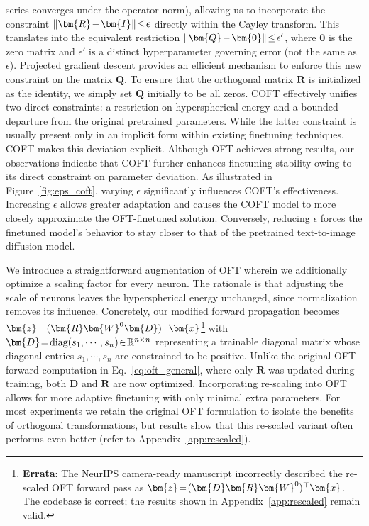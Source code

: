 series converges under the operator norm), allowing us to incorporate the constraint $\thickmuskip=2mu \medmuskip=2mu\|\bm{R}-\bm{I}\|\leq\epsilon$ directly within the Cayley transform. This translates into the equivalent restriction $\thickmuskip=2mu \medmuskip=2mu \|\bm{Q}-\bm{0}\|\leq\epsilon'$, where $\bm{0}$ is the zero matrix and $\epsilon'$ is a distinct hyperparameter governing error (not the same as $\epsilon$). Projected gradient descent provides an efficient mechanism to enforce this new constraint on the matrix $\bm{Q}$. To ensure that the orthogonal matrix $\bm{R}$ is initialized as the identity, we simply set $\bm{Q}$ initially to be all zeros. COFT effectively unifies two direct constraints: a restriction on hyperspherical energy and a bounded departure from the original pretrained parameters. While the latter constraint is usually present only in an implicit form within existing finetuning techniques, COFT makes this deviation explicit. Although OFT achieves strong results, our observations indicate that COFT further enhances finetuning stability owing to its direct constraint on parameter deviation. As illustrated in Figure~\ref{fig:eps_coft}, varying $\epsilon$ significantly influences COFT's effectiveness. Increasing $\epsilon$ allows greater adaptation and causes the COFT model to more closely approximate the OFT-finetuned solution. Conversely, reducing $\epsilon$ forces the finetuned model’s behavior to stay closer to that of the pretrained text-to-image diffusion model.

We introduce a straightforward augmentation of OFT wherein we additionally optimize a scaling factor for every neuron. The rationale is that adjusting the scale of neurons leaves the hyperspherical energy unchanged, since normalization removes its influence. Concretely, our modified forward propagation becomes $\thickmuskip=2mu \medmuskip=2mu\bm{z}=(\bm{R}\bm{W}^0\bm{D})^\top\bm{x}$\footnote{\textbf{Errata}: The NeurIPS camera-ready manuscript incorrectly described the re-scaled OFT forward pass as $\thickmuskip=2mu \medmuskip=2mu\bm{z}=(\bm{D}\bm{R}\bm{W}^0)^\top\bm{x}$. The codebase is correct; the results shown in Appendix~\ref{app:rescaled} remain valid.} with $\thickmuskip=2mu \medmuskip=2mu \bm{D}=\text{diag}(s_1,\cdots,s_n)\in\mathbb{R}^{n\times n}$ representing a trainable diagonal matrix whose diagonal entries $s_1,\cdots,s_n$ are constrained to be positive. Unlike the original OFT forward computation in Eq.~\eqref{eq:oft_general}, where only $\bm{R}$ was updated during training, both $\bm{D}$ and $\bm{R}$ are now optimized. Incorporating re-scaling into OFT allows for more adaptive finetuning with only minimal extra parameters. For most experiments we retain the original OFT formulation to isolate the benefits of orthogonal transformations, but results show that this re-scaled variant often performs even better (refer to Appendix~\ref{app:rescaled}).


